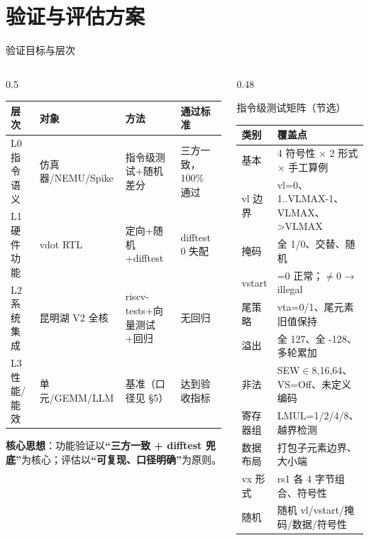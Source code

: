 \documentclass[aspectratio=169]{beamer}
\newcommand{\smalltable}[1]{\par\centering\scriptsize #1\par}
\begin{document}
\section{验证与评估方案}

\begin{frame}{验证目标与层次}
\begin{columns}[T]
\begin{column}{0.5\textwidth}
\smalltable{%
\begin{tabular}{@{}llll@{}}
\toprule
层次 & 对象 & 方法 & 通过标准 \\
\midrule
L0 指令语义 & 仿真器/NEMU/Spike & 指令级测试+随机差分 & 三方一致，100\% 通过 \\
L1 硬件功能 & vdot RTL & 定向+随机+difftest & difftest 0 失配 \\
L2 系统集成 & 昆明湖 V2 全核 & riscv-tests+向量测试+回归 & 无回归 \\
L3 性能/能效 & 单元/GEMM/LLM & 基准（口径见 §5） & 达到验收指标 \\
\bottomrule
\end{tabular}}
\vspace{0.4em}
\textbf{核心思想}：功能验证以\textbf{“三方一致 + difftest 兜底”}为核心；评估以\textbf{“可复现、口径明确”}为原则。
\end{column}
\begin{column}{0.48\textwidth}
\begin{block}{指令级测试矩阵（节选）}
\smalltable{%
\begin{tabular}{@{}ll@{}}
\toprule
类别 & 覆盖点 \\
\midrule
基本 & 4 符号性 × 2 形式 × 手工算例 \\
vl 边界 & vl=0、1..VLMAX-1、VLMAX、>VLMAX \\
掩码 & 全 1/0、交替、随机 \\
vstart & =0 正常；$\neq$0 → illegal \\
尾策略 & vta=0/1、尾元素旧值保持 \\
溢出 & 全 127、全 -128、多轮累加 \\
非法 & SEW$\in${8,16,64}、VS=Off、未定义编码 \\
寄存器组 & LMUL=1/2/4/8、越界检测 \\
数据布局 & 打包子元素边界、大小端 \\
vx 形式 & rs1 各 4 字节组合、符号性 \\
随机 & 随机 vl/vstart/掩码/数据/符号性 \\
\bottomrule
\end{tabular}}
\end{block}
\end{column}
\end{columns}
\end{frame}
\end{document}
